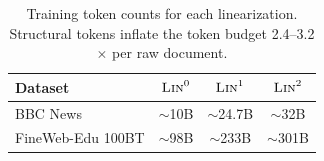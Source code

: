 \documentclass[11pt]{article}
\begin{document}





\begin{table}[htbp]
  \centering
  \setlength{\tabcolsep}{3.5pt}
  \begin{tabular}{lccc}
    \toprule
    Dataset & $\textsc{Lin}^0$ & $\textsc{Lin}^1$ & $\textsc{Lin}^2$ \\
    \midrule
    BBC News & $\sim$10B & $\sim$24.7B & $\sim$32B \\
    FineWeb-Edu 100BT & $\sim$98B & $\sim$233B & $\sim$301B \\
    \bottomrule
  \end{tabular}
  \caption{Training token counts for each linearization. Structural tokens inflate the token budget 2.4--3.2$\times$ per raw document.}
  \label{tab:token-budgets}
\end{table}



\end{document}
